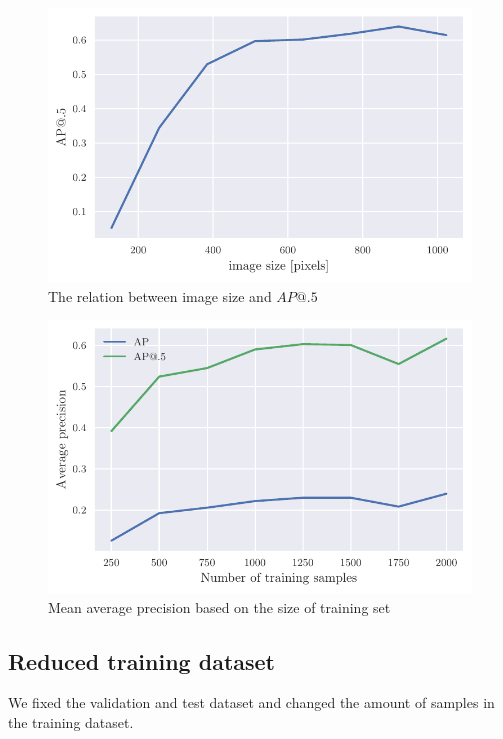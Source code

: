 \begin{paracol}{2}
    \begin{figure}
        \centering
        \includegraphics[width=0.99\linewidth]{images/img_size_dependency.pdf}
        \caption{The relation between image size and $AP@.5$}
        \label{fig:img_sizes}
    \end{figure}
    \switchcolumn
    \begin{figure}
        \centering
        \includegraphics[width=0.99\linewidth]{images/training_set_dependency.pdf}
        \caption{Mean average precision based on the size of training set}
        \label{fig:training_set_sizes}
    \end{figure}
\end{paracol}


\subsection{Reduced training dataset}
We fixed the validation and test dataset and changed the amount of samples in the training dataset.


